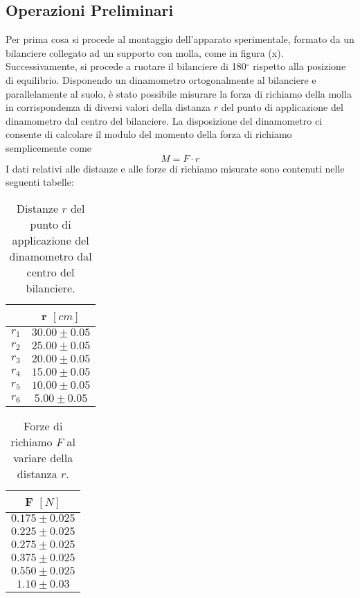 \subsection{Operazioni Preliminari}
Per prima cosa si procede al montaggio dell'apparato sperimentale, formato da un bilanciere collegato ad un supporto con molla, come in figura (x). Successivamente, si procede a ruotare il bilanciere di 180\(^\circ\) rispetto alla posizione di equilibrio. Disponendo un dinamometro ortogonalmente al bilanciere e parallelamente al suolo, è stato possibile misurare la forza di richiamo della molla in corrispondenza di diversi valori della distanza $r$ del punto di applicazione del dinamometro dal centro del bilanciere. La disposizione del dinamometro ci consente di calcolare il modulo del momento della forza di richiamo semplicemente come 
\begin{equation}
    M = F \cdot r
\end{equation}
I dati relativi alle distanze e alle forze di richiamo misurate sono contenuti nelle seguenti tabelle:

\begin{table}[H]
	\centering
	\begin{tabular}{|c|c|}
		\hline
		& \textbf{r $[cm]$ } \\
		\hline
		  $r_1$ & $30.00\pm 0.05$ \\
		$r_2$ & $25.00\pm 0.05$ \\
		$r_3$ & $20.00\pm 0.05$ \\
		$r_4$ & $15.00\pm 0.05$ \\
		$r_5$ & $10.00\pm 0.05$ \\
            $r_6$ & $5.00 \pm 0.05$ \\
		\hline
	\end{tabular}
	\caption{Distanze $r$ del punto di applicazione del dinamometro dal centro del bilanciere.}
	\label{tab:}
\end{table}

\begin{table}[H]
	\centering
	\begin{tabular}{|c|}
		\hline
		\textbf{F $[N]$} \\
		\hline
		$0.175\pm 0.025$ \\
		$0.225\pm 0.025$ \\
		$0.275\pm 0.025$ \\
		$0.375\pm 0.025$ \\
		$0.550\pm 0.025$ \\
            $1.10 \pm 0.03$ \\
		\hline
	\end{tabular}
	\caption{Forze di richiamo $F$ al variare della distanza $r$.}
	\label{tab:}
\end{table}

